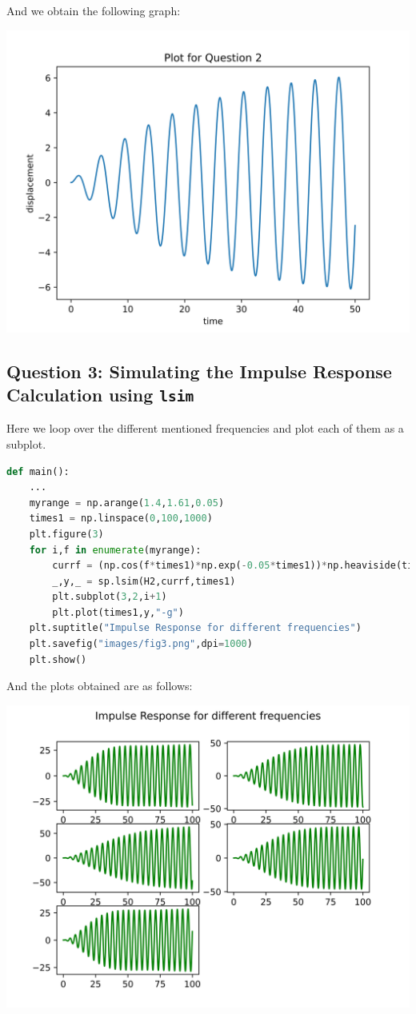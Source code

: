 \documentclass[12pt]{article}
\begin{document}
And we obtain the following graph:

\begin{center}
    \includegraphics[scale=1]{images/fig2.png}
\end{center}

\pagebreak
\subsection{Question 3: Simulating the Impulse Response Calculation using \texttt{lsim}}
Here we loop over the different mentioned frequencies and plot each of them as a subplot.

\begin{lstlisting}[language=Python]
def main():
    ...
    myrange = np.arange(1.4,1.61,0.05)
    times1 = np.linspace(0,100,1000)
    plt.figure(3)
    for i,f in enumerate(myrange):
        currf = (np.cos(f*times1)*np.exp(-0.05*times1))*np.heaviside(times,0)
        _,y,_ = sp.lsim(H2,currf,times1)
        plt.subplot(3,2,i+1)
        plt.plot(times1,y,"-g")
    plt.suptitle("Impulse Response for different frequencies")
    plt.savefig("images/fig3.png",dpi=1000)
    plt.show()
\end{lstlisting}

And the plots obtained are as follows:
\begin{center}
    \includegraphics[scale=1]{images/fig3.png}
\end{center}
\pagebreak
\end{document}

